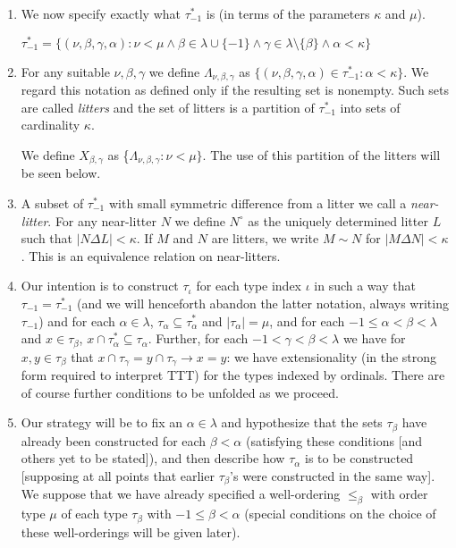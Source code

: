 \documentclass[12pt]{article}
\begin{document}
\begin{enumerate}
\item We now specify exactly what $\tau^*_{-1}$ is (in terms of the parameters $\kappa$ and $\mu$).

$\tau^*_{-1}= \{(\nu,\beta,\gamma,\alpha):\nu<\mu \wedge  \beta \in \lambda\cup \{-1\} \wedge \gamma \in \lambda \setminus \{\beta\}\wedge \alpha<\kappa\}$

\item For any suitable $\nu, \beta, \gamma$ we define $\Lambda_{\nu,\beta,\gamma}$ as $\{(\nu,\beta,\gamma,\alpha)\in \tau^*_{-1}:\alpha<\kappa\}$.  We regard this notation as defined
only if the resulting set is nonempty.  Such sets are called {\em litters} and the set of litters is a partition of $\tau^*_{-1}$ into sets of cardinality $\kappa$.

We define $X_{\beta,\gamma}$ as \{$\Lambda_{\nu,\beta,\gamma}:\nu<\mu\}$.  The use of this partition of the litters will be seen below.

\item A subset of $\tau^*_{-1}$ with small symmetric difference from a litter we call a {\em near-litter\/}.  For any near-litter $N$ we define $N^\circ$ as the uniquely determined litter $L$
such that $|N \Delta L|<\kappa$.  If $M$ and $N$ are litters, we write $M \sim N$ for $|M \Delta N| < \kappa$.  This is an equivalence relation on near-litters.

\item Our intention is to construct $\tau_\iota$ for each type index $\iota$ in such a way that $\tau_{-1} = \tau^*_{-1}$ (and we will henceforth abandon the latter notation, always writing $\tau_{-1}$)
and for each $\alpha \in \lambda$, $\tau_\alpha \subseteq \tau^*_\alpha$ and $|\tau_\alpha| = \mu$, and for each $-1 \leq \alpha < \beta <\lambda$ and $x \in \tau_\beta$,
$x \cap \tau^*_\alpha\subseteq \tau_\alpha$.   Further, for each $-1<\gamma<\beta<\lambda$ we
have for $x,y \in \tau_\beta$ that $x \cap \tau_\gamma = y \cap \tau_\gamma \rightarrow x=y$:  we have extensionality (in the strong form required to interpret TTT)  for the types indexed by ordinals.  There are of course further conditions to be unfolded as we proceed.

\item Our strategy will be to fix an $\alpha\in \lambda$ and hypothesize that the sets $\tau_\beta$ have already been constructed for each $\beta<\alpha$ (satisfying these conditions [and others yet to be stated]), and then describe how $\tau_\alpha$ is to be constructed [supposing at all points that earlier $\tau_\beta$'s were constructed in the same way].   We suppose that we have already specified
a well-ordering $\leq_\beta$ with order type $\mu$ of each type $\tau_\beta$ with $-1\leq \beta <\alpha$ (special conditions on the choice of these well-orderings will be given later).   


\end{enumerate}
\end{document}
